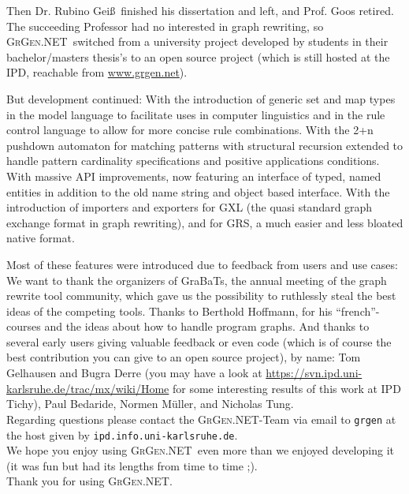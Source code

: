 \documentclass[a4paper,final,11pt]{book}
\providecommand{\GrG}{{\scshape GrGen.NET}}
\begin{document}
Then Dr. Rubino Gei\ss~finished his dissertation \cite{DissRuby} and left, and Prof. Goos retired.
The succeeding Professor had no interested in graph rewriting,
so \GrG\ switched from a university project developed by students in their bachelor/masters thesis's
to an open source project (which is still hosted at the IPD, reachable from \url{www.grgen.net}).
\medskip

But development continued:
With the introduction of generic set and map types in the model language to facilitate uses in computer linguistics
and in the rule control language to allow for more concise rule combinations.
With the 2+n pushdown automaton for matching patterns with structural recursion extended 
to handle pattern cardinality specifications and positive applications conditions.
With massive API improvements, now featuring an interface of typed, named entities in addition to the old name string and object based interface.
With the introduction of importers and exporters for GXL (the quasi standard graph exchange format in graph rewriting),
and for GRS, a much easier and less bloated native format.\smallskip

Most of these features were introduced due to feedback from users and use cases:\\
We want to thank the organizers of GraBaTs\cite{grabats}, the annual meeting of the graph rewrite tool community,
which gave us the possibility to ruthlessly steal the best ideas of the competing tools.
Thanks to Berthold Hoffmann, for his ``french''-courses and the ideas about how to handle program graphs.
And thanks to several early users giving valuable feedback or even code (which is of course the best contribution you can give to an open source project), by name: 
Tom Gelhausen and Bugra Derre (you may have a look at \url{https://svn.ipd.uni-karlsruhe.de/trac/mx/wiki/Home} for some interesting results of this work at IPD Tichy), Paul Bedaride, Normen Müller, and Nicholas Tung.
\\[1ex]

\noindent Regarding questions please contact the \GrG-Team 
via email to \texttt{grgen} at the host given by \texttt{ipd.info.uni-karlsruhe.de}.\\[1ex]

\noindent We hope you enjoy using \GrG\ even more than we enjoyed developing it\\ (it was fun but had its lengths from time to time ;).
\\[1ex]

Thank you for using \GrG.\\[2ex]
\end{document}

